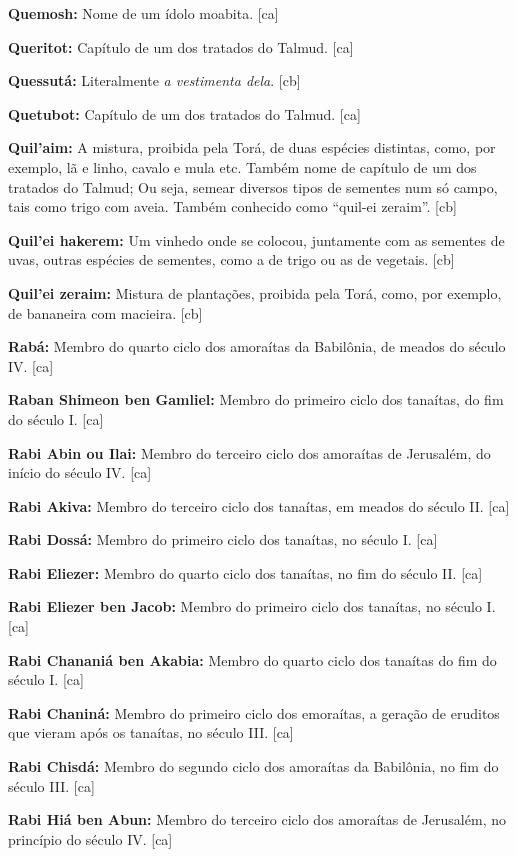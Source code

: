 \textbf{Quemosh:} Nome de um ídolo moabita. [ca]

\textbf{Queritot:} Capítulo de um dos tratados do Talmud. [ca]

\textbf{Quessutá:} Literalmente \emph{a vestimenta dela}. [cb]

\textbf{Quetubot:} Capítulo de um dos tratados do Talmud. [ca]

\textbf{Quil'aim:} A mistura, proibida pela Torá, de duas espécies
distintas, como, por exemplo, lã e linho, cavalo e mula etc. Também
nome de capítulo de um dos tratados do Talmud; Ou seja, semear diversos tipos de sementes num só campo, tais como
  trigo com aveia. Também conhecido como ``quil-ei
  zeraim''. [cb]

\textbf{Quil'ei hakerem:} Um vinhedo onde se colocou, juntamente 
com as sementes de uvas, 
outras espécies de sementes, como a de trigo ou as de vegetais. [cb]

\textbf{Quil'ei zeraim:} Mistura de plantações, proibida pela Torá,
como, por exemplo, de bananeira com macieira. [cb]

\textbf{Rabá:} Membro do quarto ciclo dos amoraítas da Babilônia, de
meados do século IV. [ca]

\textbf{Raban Shimeon ben Gamliel:} Membro do primeiro ciclo dos tanaítas,
do fim do século I. [ca]

\textbf{Rabi Abin ou Ilai:} Membro do
terceiro ciclo dos amoraítas de Jerusalém, do início do século IV. [ca]

\textbf{Rabi Akiva:} Membro do terceiro ciclo dos tanaítas, em meados do 
século II. [ca]

\textbf{Rabi Dossá:} Membro do primeiro ciclo dos tanaítas, no século I. [ca]

\textbf{Rabi Eliezer:} Membro do quarto ciclo dos tanaítas, 
no fim do século II. [ca]

\textbf{Rabi Eliezer ben Jacob:} Membro do primeiro ciclo dos 
tanaítas, no século I. [ca]

\textbf{Rabi Chananiá ben Akabia:} Membro do quarto ciclo 
dos tanaítas do fim do século I. [ca]

\textbf{Rabi Chaniná:} Membro do primeiro ciclo dos emoraítas, 
a geração de eruditos que vieram após os tanaítas, no século III. [ca]

\textbf{Rabi Chisdá:} Membro do segundo ciclo dos amoraítas da Babilônia, 
no fim do século III. [ca]

\textbf{Rabi Hiá ben Abun:} Membro do terceiro ciclo dos amoraítas de
Jerusalém, no princípio do século IV. [ca]

